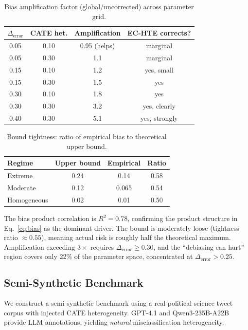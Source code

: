 \documentclass[11pt,a4paper]{article}
\begin{document}
\begin{table}[t]
\centering
\small
\caption{Bias amplification factor (global/uncorrected) across parameter grid.}
\label{tab:amplification}
\begin{tabular}{@{}cccc@{}}
\toprule
$\Delta_{\text{error}}$ & CATE het. & Amplification & EC-HTE corrects? \\
\midrule
0.05 & 0.10 & 0.95 (helps) & marginal \\
0.05 & 0.30 & 1.1 & marginal \\
0.15 & 0.10 & 1.2 & yes, small \\
0.15 & 0.30 & 1.5 & yes \\
0.30 & 0.10 & 1.8 & yes \\
0.30 & 0.30 & 3.2 & yes, clearly \\
0.40 & 0.30 & 5.1 & yes, strongly \\
\bottomrule
\end{tabular}
\end{table}

\begin{table}[t]
\centering
\small
\caption{Bound tightness: ratio of empirical bias to theoretical upper bound.}
\label{tab:bound}
\begin{tabular}{@{}lccc@{}}
\toprule
Regime & Upper bound & Empirical & Ratio \\
\midrule
Extreme & 0.24 & 0.14 & 0.58 \\
Moderate & 0.12 & 0.065 & 0.54 \\
Homogeneous & 0.02 & 0.01 & 0.50 \\
\bottomrule
\end{tabular}
\end{table}

The bias product correlation is $R^2 = 0.78$, confirming the product structure in Eq.~\ref{eq:bias} as the dominant driver. The bound is moderately loose (tightness ratio $\approx 0.55$), meaning actual risk is roughly half the theoretical maximum. Amplification exceeding $3\times$ requires $\Delta_{\text{error}} \geq 0.30$, and the ``debiasing can hurt'' region covers only 22\% of the parameter space, concentrated at $\Delta_{\text{error}} > 0.25$.

\subsection{Semi-Synthetic Benchmark}
\label{sec:semisynthetic}

We construct a semi-synthetic benchmark using a real political-science tweet corpus with injected CATE heterogeneity. GPT-4.1 and Qwen3-235B-A22B provide LLM annotations, yielding \emph{natural} misclassification heterogeneity.
\end{document}
